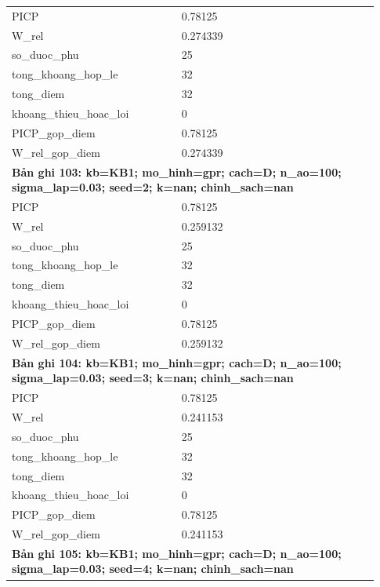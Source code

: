 \begin{longtable}{p{0.43\linewidth}p{0.50\linewidth}}
PICP & 0.78125 \\
W\_\allowbreak rel & 0.274339 \\
so\_\allowbreak duoc\_\allowbreak phu & 25 \\
tong\_\allowbreak khoang\_\allowbreak hop\_\allowbreak le & 32 \\
tong\_\allowbreak diem & 32 \\
khoang\_\allowbreak thieu\_\allowbreak hoac\_\allowbreak loi & 0 \\
PICP\_\allowbreak gop\_\allowbreak diem & 0.78125 \\
W\_\allowbreak rel\_\allowbreak gop\_\allowbreak diem & 0.274339 \\
\midrule
\multicolumn{2}{p{0.95\linewidth}}{\textbf{Bản ghi 103: kb=KB1; mo\_hinh=gpr; cach=D; n\_ao=100; sigma\_lap=0.03; seed=2; k=nan; chinh\_sach=nan}} \\
PICP & 0.78125 \\
W\_\allowbreak rel & 0.259132 \\
so\_\allowbreak duoc\_\allowbreak phu & 25 \\
tong\_\allowbreak khoang\_\allowbreak hop\_\allowbreak le & 32 \\
tong\_\allowbreak diem & 32 \\
khoang\_\allowbreak thieu\_\allowbreak hoac\_\allowbreak loi & 0 \\
PICP\_\allowbreak gop\_\allowbreak diem & 0.78125 \\
W\_\allowbreak rel\_\allowbreak gop\_\allowbreak diem & 0.259132 \\
\midrule
\multicolumn{2}{p{0.95\linewidth}}{\textbf{Bản ghi 104: kb=KB1; mo\_hinh=gpr; cach=D; n\_ao=100; sigma\_lap=0.03; seed=3; k=nan; chinh\_sach=nan}} \\
PICP & 0.78125 \\
W\_\allowbreak rel & 0.241153 \\
so\_\allowbreak duoc\_\allowbreak phu & 25 \\
tong\_\allowbreak khoang\_\allowbreak hop\_\allowbreak le & 32 \\
tong\_\allowbreak diem & 32 \\
khoang\_\allowbreak thieu\_\allowbreak hoac\_\allowbreak loi & 0 \\
PICP\_\allowbreak gop\_\allowbreak diem & 0.78125 \\
W\_\allowbreak rel\_\allowbreak gop\_\allowbreak diem & 0.241153 \\
\midrule
\multicolumn{2}{p{0.95\linewidth}}{\textbf{Bản ghi 105: kb=KB1; mo\_hinh=gpr; cach=D; n\_ao=100; sigma\_lap=0.03; seed=4; k=nan; chinh\_sach=nan}} \\

\end{longtable}

